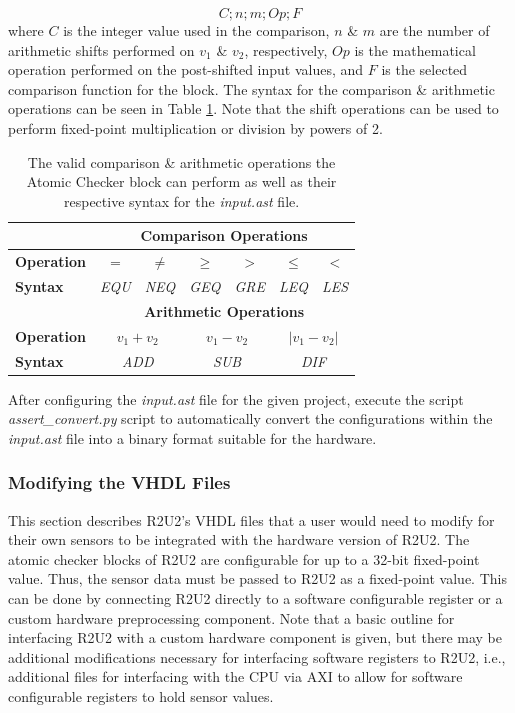 \begin{equation}
	C;n;m;Op;F
\end{equation} 
where $C$ is the integer value used in the comparison, $n$ \& $m$ are the number of arithmetic shifts performed on $v_1$ \& $v_2$, respectively, $Op$ is the mathematical operation performed on the post-shifted input values, and $F$ is the selected comparison function for the block. The syntax for the comparison \& arithmetic operations can be seen in Table \ref{syntaxACB}. Note that the shift operations can be used to perform fixed-point multiplication or division by powers of 2. 

\begin{table}[H]
	\caption{The valid comparison \& arithmetic operations the Atomic Checker block can perform as well as their respective syntax for the \textit{input.ast} file.
	\label{syntaxACB}}
	\begin{center}
	\begin{tabular}{l | c | c | c | c | c | c}
		\hline
		\hline
		&\multicolumn{6}{c}{\textbf{Comparison Operations}}\\
		\hline
		\textbf{Operation} & $=$ & $\neq$ & $\geq$ & $>$ & $\leq$ & $<$ \\
		\hline
		\textbf{Syntax} & \textit{EQU} & \textit{NEQ} & \textit{GEQ} & \textit{GRE} & \textit{LEQ} & \textit{LES}\\
		\hline
		\hline
		&\multicolumn{6}{c}{\textbf{Arithmetic Operations}}\\
		\hline
		\textbf{Operation} & \multicolumn{2}{c}{$v_1+v_2$} & \multicolumn{2}{c}{$v_1-v_2$} &\multicolumn{2}{c}{$|v_1-v_2|$} \\
		\hline
		\textbf{Syntax} & \multicolumn{2}{c}{\textit{ADD}} & \multicolumn{2}{c}{\textit{SUB}} & \multicolumn{2}{c}{\textit{DIF}}\\
		\hline
		\hline
	\end{tabular}
	\end{center}
\end{table}

After configuring the \textit{input.ast} file for the given project, execute the script \textit{assert\_convert.py} script to automatically convert the configurations within the \textit{input.ast} file into a binary format suitable for the hardware.


\subsubsection{Modifying the VHDL Files}
\label{ModVHDL}
This section describes R2U2's VHDL files that a user would need to modify for their own sensors to be integrated with the hardware version of R2U2. The atomic checker blocks of R2U2 are configurable for up to a 32-bit fixed-point value. Thus, the sensor data must be passed to R2U2 as a fixed-point value. This can be done by connecting R2U2 directly to a software configurable register or a custom hardware preprocessing component. Note that a basic outline for interfacing R2U2 with a custom hardware component is given, but there may be additional modifications necessary for interfacing software registers to R2U2, i.e., additional files for interfacing with the CPU via AXI to allow for software configurable registers to hold sensor values.

